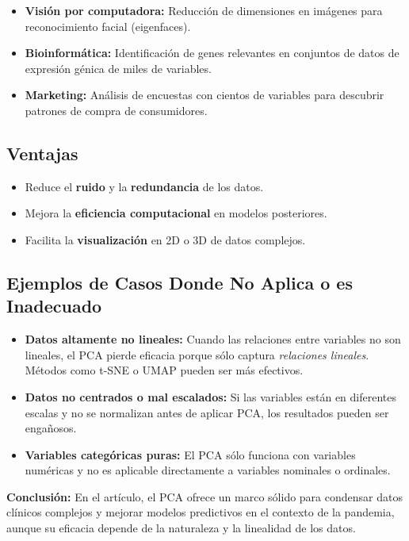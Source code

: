 \documentclass[12pt]{article}
\begin{document}
\begin{itemize}
	\item \textbf{Visión por computadora:} Reducción de dimensiones en imágenes para reconocimiento facial (eigenfaces).
	\item \textbf{Bioinformática:} Identificación de genes relevantes en conjuntos de datos de expresión génica de miles de variables.
	\item \textbf{Marketing:} Análisis de encuestas con cientos de variables para descubrir patrones de compra de consumidores.
\end{itemize}

\subsection*{Ventajas}

\begin{itemize}
	\item Reduce el \textbf{ruido} y la \textbf{redundancia} de los datos.
	\item Mejora la \textbf{eficiencia computacional} en modelos posteriores.
	\item Facilita la \textbf{visualización} en 2D o 3D de datos complejos.
\end{itemize}

\subsection*{Ejemplos de Casos Donde No Aplica o es Inadecuado}

\begin{itemize}
	\item \textbf{Datos altamente no lineales:} Cuando las relaciones entre variables no son lineales, el PCA pierde eficacia porque sólo captura \emph{relaciones lineales}. Métodos como t-SNE o UMAP pueden ser más efectivos.
	\item \textbf{Datos no centrados o mal escalados:} Si las variables están en diferentes escalas y no se normalizan antes de aplicar PCA, los resultados pueden ser engañosos.
	\item \textbf{Variables categóricas puras:} El PCA sólo funciona con variables numéricas y no es aplicable directamente a variables nominales o ordinales.
\end{itemize}

\vspace{1em}
\noindent
\textbf{Conclusión:} En el artículo, el PCA ofrece un marco sólido para condensar datos clínicos complejos y mejorar modelos predictivos en el contexto de la pandemia, aunque su eficacia depende de la naturaleza y la linealidad de los datos.
\end{document}
